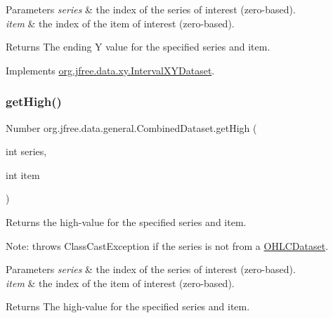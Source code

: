 \begin{DoxyParams}{Parameters}
{\em series} & the index of the series of interest (zero-\/based). \\
\hline
{\em item} & the index of the item of interest (zero-\/based).\\
\hline
\end{DoxyParams}
\begin{DoxyReturn}{Returns}
The ending Y value for the specified series and item. 
\end{DoxyReturn}


Implements \mbox{\hyperlink{interfaceorg_1_1jfree_1_1data_1_1xy_1_1_interval_x_y_dataset_ae938af574bad07e7f47a8b423223ef9b}{org.\+jfree.\+data.\+xy.\+Interval\+X\+Y\+Dataset}}.

\mbox{\label{classorg_1_1jfree_1_1data_1_1general_1_1_combined_dataset_a6709a0b24bb619f18f80d1f70b7d7019}} 
\subsubsection{\texorpdfstring{get\+High()}{getHigh()}}
{\footnotesize\ttfamily Number org.\+jfree.\+data.\+general.\+Combined\+Dataset.\+get\+High (\begin{DoxyParamCaption}\item[{int}]{series,  }\item[{int}]{item }\end{DoxyParamCaption})}

Returns the high-\/value for the specified series and item. 

Note\+: throws {\ttfamily Class\+Cast\+Exception} if the series is not from a \mbox{\hyperlink{}{O\+H\+L\+C\+Dataset}}.


\begin{DoxyParams}{Parameters}
{\em series} & the index of the series of interest (zero-\/based). \\
\hline
{\em item} & the index of the item of interest (zero-\/based).\\
\hline
\end{DoxyParams}
\begin{DoxyReturn}{Returns}
The high-\/value for the specified series and item. 
\end{DoxyReturn}


